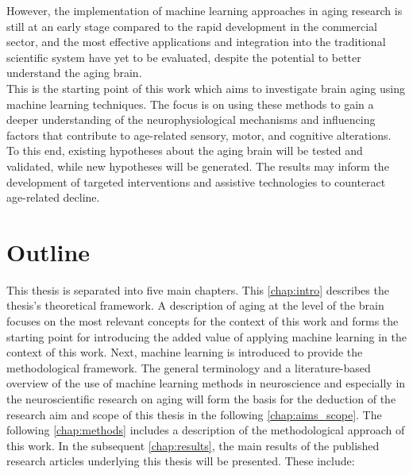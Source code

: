 However, the implementation of machine learning approaches in aging research is still at an early stage compared to the rapid development in the commercial sector, and the most effective applications and integration into the traditional scientific system have yet to be evaluated, despite the potential to better understand the aging brain.\\
This is the starting point of this work which aims to investigate brain aging using machine learning techniques. The focus is on using these methods to gain a deeper understanding of the neurophysiological mechanisms and influencing factors that contribute to age-related sensory, motor, and cognitive alterations. To this end, existing hypotheses about the aging brain will be tested and validated, while new hypotheses will be generated. The results may inform the development of targeted interventions and assistive technologies to counteract age-related decline.

\section{Outline}
This thesis is separated into five main chapters. This \autoref{chap:intro} describes the thesis's theoretical framework. A description of aging at the level of the brain focuses on the most relevant concepts for the context of this work and forms the starting point for introducing the added value of applying machine learning in the context of this work. Next, machine learning is introduced to provide the methodological framework. The general terminology and a literature-based overview of the use of machine learning methods in neuroscience and especially in the neuroscientific research on aging will form the basis for the deduction of the research aim and scope of this thesis in the following \autoref{chap:aims_scope}. The following \autoref{chap:methods} includes a description of the methodological approach of this work. In the subsequent \autoref{chap:results}, the main results of the published research articles underlying this thesis will be presented. These include:

